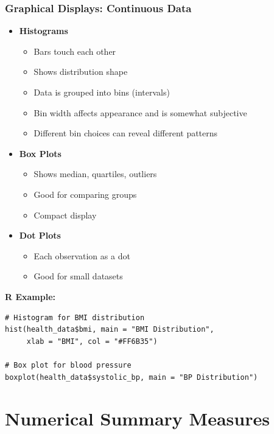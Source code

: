 \documentclass{beamer}
\begin{document}
\begin{frame}[fragile]
\frametitle{Graphical Displays: Continuous Data}
\begin{itemize}
\item \textbf{Histograms}
  \begin{itemize}
  \item Bars touch each other
  \item Shows distribution shape
  \item Data is grouped into bins (intervals)
  \item Bin width affects appearance and is somewhat subjective
  \item Different bin choices can reveal different patterns
  \end{itemize}
\item \textbf{Box Plots}
  \begin{itemize}
  \item Shows median, quartiles, outliers
  \item Good for comparing groups
  \item Compact display
  \end{itemize}
\item \textbf{Dot Plots}
  \begin{itemize}
  \item Each observation as a dot
  \item Good for small datasets
  \end{itemize}
\end{itemize}

\vspace{0.2cm}
\textbf{R Example:}
\tiny
\begin{verbatim}
# Histogram for BMI distribution
hist(health_data$bmi, main = "BMI Distribution",
     xlab = "BMI", col = "#FF6B35")

# Box plot for blood pressure
boxplot(health_data$systolic_bp, main = "BP Distribution")
\end{verbatim}
\end{frame}

\section{Numerical Summary Measures}
\end{document}
